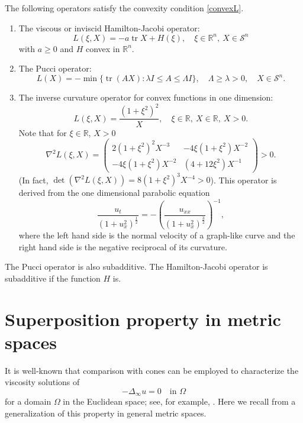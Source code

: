 \documentclass[12pt, reqno]{amsart}
\newcommand{\R}{\mathbb{R}}
\def\R{{\mathbb R}}
\def\S{{\mathcal S}}
\DeclareMathOperator{\tr}{tr}
\begin{document}
The following operators satisfy the convexity condition \eqref{convexL}. 
\begin{enumerate}
    \item[(a)] The viscous or inviscid Hamilton-Jacobi operator: 
    \[
    L(\xi, X)= -a \tr X+H(\xi), \quad \xi\in \R^n,\  X\in \S^n
    \]
    with $a\geq 0$ and $H$ convex in $\R^n$. 
    \item[(b)] The Pucci operator: 
    \[
    L(X)=- \min\{\tr(AX): \lambda I\leq  A\leq \Lambda I\}, \quad \Lambda\geq \lambda >0, \quad X\in \S^n. 
    \]
    \item[(c)] The inverse curvature operator for convex functions in one dimension: 
    \[
    L(\xi, X)= \frac{(1+\xi^2)^2}{X}, \quad \xi\in \R, \ X\in \R, \ X>0. 
    \]
    Note that for $\xi\in \R$, $X>0$ 
    \[
    \nabla^2 L(\xi, X) =\begin{pmatrix}
        2(1+\xi^2)^2 X^{-3} & -4\xi (1+\xi^2)X^{-2}  \\
        -4\xi (1+\xi^2)X^{-2} & (4+12\xi^2) X^{-1}
    \end{pmatrix}>0.
    \]
    (In fact, $\det(\nabla^2 L(\xi, X))=8(1+\xi^2)^3X^{-4}>0$). This operator is derived from the one dimensional parabolic equation
    \[
    \frac{u_t}{(1+u_x^2)^{\frac{1}{2}}}=-\left(\frac{u_{xx}}{(1+u_x^2)^{\frac{3}{2}}}\right)^{-1},
    \]
    where the left hand side is the normal velocity of a graph-like curve and the right hand side is the negative reciprocal of its curvature. 
\end{enumerate}
The Pucci operator is also subadditive. The Hamilton-Jacobi operator is subadditive if the function $H$ is. 



\section{Superposition property in metric spaces}\label{metric}

It is well-known that comparison with cones can be employed to characterize the viscosity solutions of  
\begin{equation}\label{inf-lap}
-\Delta_\infty u=0 \quad \text{in $\Omega$}
\end{equation}
for a domain $\Omega$ in the Euclidean space; see, for example, \cite{ArCrJu}. Here we recall from \cite{Ju, JuSh} a generalization of this property in general metric spaces. 
\end{document}

